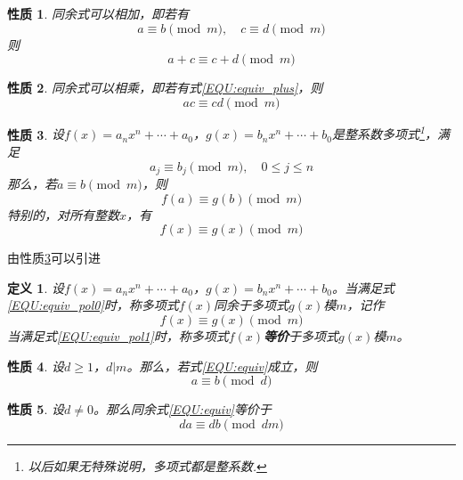 \documentclass{ctexrep}
\newcommand{\bbold}[1]{\textbf{#1}}
\newtheorem{prop}{性质}[section]
\newtheorem{defn}{定义}[section]
\begin{document}
\begin{prop}
同余式可以相加，即若有
\begin{equation}\label{EQU:equiv_plus}
a\equiv b\pmod{m},\quad c\equiv d\pmod{m}
\end{equation}
则
\begin{displaymath}
a+c\equiv c+d\pmod{m}
\end{displaymath}
\end{prop}

\begin{prop}
同余式可以相乘，即若有式\ref{EQU:equiv_plus}，则
\begin{displaymath}
ac\equiv cd\pmod{m}
\end{displaymath}
\end{prop}

\begin{prop}\label{PROP:equiv_pol}
设$f(x)=a_n x^n+\dotsb+a_0$，$g(x)=b_n x^n+\dotsb+b_0$是整系数多项式\footnote{以后如果无特殊说明，多项式都是整系数.}，满足
\begin{equation}\label{EQU:equiv_pol0}
a_j\equiv b_j\pmod{m},\quad 0\leq j\leq n
\end{equation}
那么，若$a\equiv b\pmod{m}$，则
\begin{displaymath}
f(a)\equiv g(b)\pmod{m}
\end{displaymath}
特别的，对所有整数$x$，有
\begin{equation}\label{EQU:equiv_pol1}
f(x)\equiv g(x)\pmod{m}
\end{equation}
\end{prop}

由性质\ref{PROP:equiv_pol}可以引进

\begin{defn}
设$f(x)=a_n x^n+\dotsb+a_0$，$g(x)=b_n x^n+\dotsb+b_0$。当满足式\ref{EQU:equiv_pol0}时，称多项式$f(x)$同余于多项式$g(x)$模$m$，记作
\begin{displaymath}
f(x)\equiv g(x)\pmod{m}
\end{displaymath}
当满足式\ref{EQU:equiv_pol1}时，称多项式$f(x)$\bbold{等价}于多项式$g(x)$模$m$。
\end{defn}

\begin{prop}
设$d\geq 1$，$d|m$。那么，若式\ref{EQU:equiv}成立，则
\begin{displaymath}
a\equiv b\pmod{d}
\end{displaymath}
\end{prop}

\begin{prop}
设$d\neq 0$。那么同余式\ref{EQU:equiv}等价于
\begin{displaymath}
da\equiv db\pmod{dm}
\end{displaymath}
\end{prop}
\end{document}
